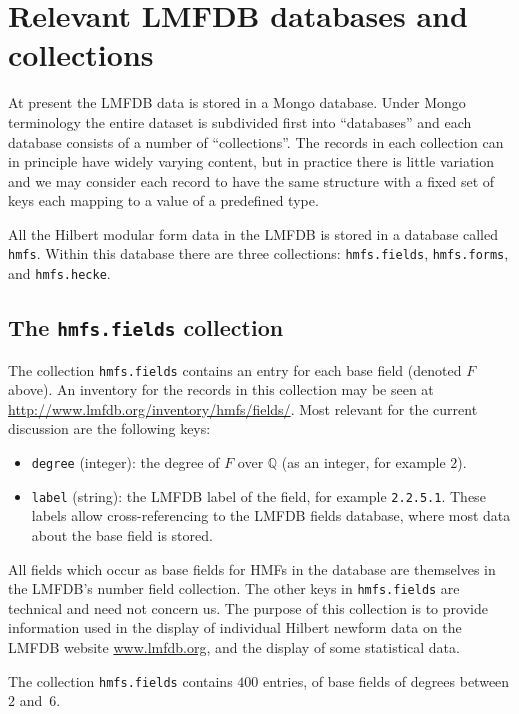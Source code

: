 \documentclass{llncs}
\def\Q{{\mathbb Q}}
\begin{document}
\section{Relevant LMFDB databases and collections}
At present the LMFDB data is stored in a Mongo database.  Under Mongo
terminology the entire dataset is subdivided first into ``databases''
and each database consists of a number of ``collections''.  The
records in each collection can in principle have widely varying
content, but in practice there is little variation and we may consider
each record to have the same structure with a fixed set of keys each
mapping to a value of a predefined type.

All the Hilbert modular form data in the LMFDB is stored in a database
called {\tt hmfs}.  Within this database there are three collections:
{\tt hmfs.fields}, {\tt hmfs.forms}, and {\tt hmfs.hecke}.

\subsection{The {\tt hmfs.fields} collection}
The collection {\tt hmfs.fields} contains an entry for each base field
(denoted $F$ above).  An inventory for the records in this collection
may be seen at \url{http://www.lmfdb.org/inventory/hmfs/fields/}.
Most relevant for the current discussion are the following keys:
\begin{itemize}
\item {\tt degree} (integer): the degree of $F$ over $\Q$ (as an
  integer, for example $2$).
\item {\tt label} (string): the LMFDB label of the field, for example
  {\tt 2.2.5.1}.  These labels allow cross-referencing to the LMFDB
  fields database, where most data about the base field is stored.
\end{itemize}
All fields which occur as base fields for HMFs in the database are
themselves in the LMFDB's number field collection.  The other keys in
{\tt hmfs.fields} are technical and need not concern us.  The purpose
of this collection is to provide information used in the display of
individual Hilbert newform data on the LMFDB website
\url{www.lmfdb.org}, and the display of some statistical data.

The collection {\tt hmfs.fields} contains $400$ entries, of base
fields of degrees between $2$ and~$6$.
\end{document}
